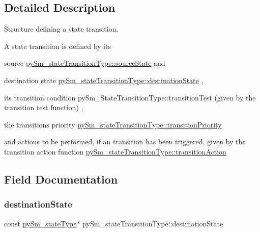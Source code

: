 \subsection{Detailed Description}
Structure defining a state transition. 

A state transition is defined by it\textquotesingle{}s
\begin{DoxyItemize}
\item source \hyperlink{structpySm__stateTransitionType_adb9a41fd9d60f064fabaa74ef2698bd7}{py\+Sm\+\_\+state\+Transition\+Type\+::source\+State} and
\item destination state \hyperlink{structpySm__stateTransitionType_aeff05523d3e91571e745460314e46116}{py\+Sm\+\_\+state\+Transition\+Type\+::destination\+State} ,
\item it\textquotesingle{}s transition condition py\+Sm\+\_\+\+State\+Transition\+Type\+::transition\+Test (given by the transition test function) ,
\item the transitions priority \hyperlink{structpySm__stateTransitionType_a0c95a5a437e65155d1100d3016f9575f}{py\+Sm\+\_\+state\+Transition\+Type\+::transition\+Priority}
\item and actions to be performed, if an transition has been triggered, given by the transition action function \hyperlink{structpySm__stateTransitionType_a02fc12242851c7d129808a4e81cf1b78}{py\+Sm\+\_\+state\+Transition\+Type\+::transition\+Action} 
\end{DoxyItemize}

\subsection{Field Documentation}
\mbox{\label{structpySm__stateTransitionType_aeff05523d3e91571e745460314e46116}} 
\subsubsection{\texorpdfstring{destination\+State}{destinationState}}
{\footnotesize\ttfamily const \hyperlink{structpySm__stateType}{py\+Sm\+\_\+state\+Type}$\ast$ py\+Sm\+\_\+state\+Transition\+Type\+::destination\+State}

\mbox{\label{structpySm__stateTransitionType_adb9a41fd9d60f064fabaa74ef2698bd7}} 
